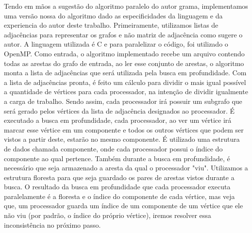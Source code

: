 \documentclass[12pt]{article}
\begin{document}
Tendo em mãos a sugestão do algoritmo paralelo do autor grama, implementamos uma versão nossa do algoritmo dado as especificidades da linguagem e da experiencia do autor deste trabalho. Primeiramente, utilizamos listas de adjacências para representar os grafos e não matriz de adjacência como sugere o autor. A linguagem utilizada é C e para paralelizar o código, foi utilizado o OpenMP. Como entrada, o algoritmo implementado recebe um arquivo contendo todas as arestas do grafo de entrada, ao ler esse conjunto de arestas, o algoritmo monta a lista de adjacências que será utilizada pela busca em profundidade. Com a lista de adjacências pronta, é feito um cálculo para dividir o mais igual possível a quantidade de vértices para cada processador, na intenção de dividir igualmente a carga de trabalho. Sendo assim, cada processador irá possuir um subgrafo que será gerado pelos vértices da lista de adjacência designados ao processador. É executado a busca em profundidade, cada processador, ao ver um vértice irá marcar esse vértice em um componente e todos os outros vértices que podem ser vistos a partir deste, estarão no mesmo componente. É utilizado uma estrutura de dados chamada componente, onde cada processador possui o índice do componente ao qual pertence. Também durante a busca em profundidade, é necessário que seja armazenado a aresta da qual o processador "viu". Utilizamos a estrutura floresta para que seja guardado os pares de arestas vistos durante a busca. O resultado da busca em profundidade que cada processador executa paralelamente é a floresta e o índice do componente de cada vértice, mas veja que, um processador guarda um índice de um componente de um vértice que ele não viu (por padrão, o índice do próprio vértice), iremos resolver essa inconsistência no próximo passo.
\end{document}
